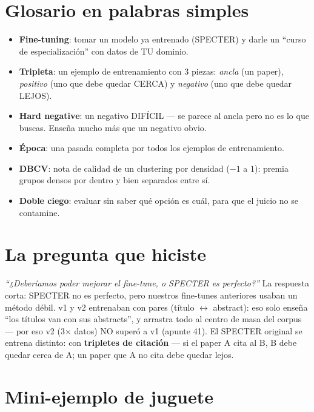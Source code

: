 \documentclass[11pt,a4paper]{article}
\begin{document}

\section{Glosario en palabras simples}

\begin{itemize}
  \item \textbf{Fine-tuning}: tomar un modelo ya entrenado (SPECTER) y darle un
        ``curso de especialización'' con datos de TU dominio.
  \item \textbf{Tripleta}: un ejemplo de entrenamiento con 3 piezas: \emph{ancla} (un
        paper), \emph{positivo} (uno que debe quedar CERCA) y \emph{negativo} (uno que
        debe quedar LEJOS).
  \item \textbf{Hard negative}: un negativo DIFÍCIL --- se parece al ancla pero no es lo
        que buscas. Enseña mucho más que un negativo obvio.
  \item \textbf{Época}: una pasada completa por todos los ejemplos de entrenamiento.
  \item \textbf{DBCV}: nota de calidad de un clustering por densidad ($-1$ a $1$):
        premia grupos densos por dentro y bien separados entre sí.
  \item \textbf{Doble ciego}: evaluar sin saber qué opción es cuál, para que el juicio
        no se contamine.
\end{itemize}

\section{La pregunta que hiciste}

\emph{``¿Deberíamos poder mejorar el fine-tune, o SPECTER es perfecto?''} La respuesta
corta: SPECTER no es perfecto, pero nuestros fine-tunes anteriores usaban un método
débil. v1 y v2 entrenaban con pares (título $\leftrightarrow$ abstract): eso solo enseña
``los títulos van con sus abstracts'', y arrastra todo al centro de masa del corpus ---
por eso v2 (3$\times$ datos) NO superó a v1 (apunte 41). El SPECTER original se entrena
distinto: con \textbf{tripletes de citación} --- si el paper A cita al B, B debe quedar
cerca de A; un paper que A no cita debe quedar lejos.

\section{Mini-ejemplo de juguete}
\end{document}
